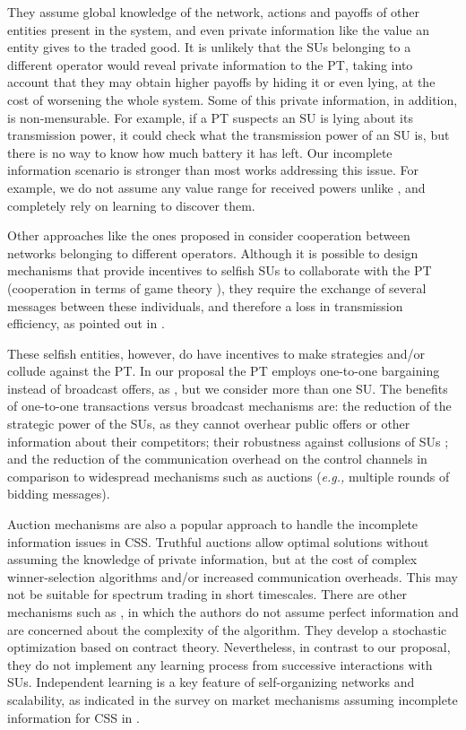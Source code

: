 They assume global knowledge of the network, actions and payoffs of other entities present in the system, and even private information like the value an entity gives to the traded good.
It is unlikely that the SUs belonging to a different operator would reveal private information to the PT, taking into account that they may obtain higher payoffs by hiding it or even lying, at the cost of worsening the whole system. 
Some of this private information, in addition, is non-mensurable. For example, if a PT suspects an SU is lying about its transmission power, it could check what the transmission power of an SU is, but there is no way to know how much battery it has left. 
Our incomplete information scenario is stronger than most works addressing this issue. 
For example, we do not assume any value range for received powers unlike \cite{ref:Feng2014}, and completely rely on learning to discover them. 

Other approaches like the ones proposed in \cite{ref:Yuan2013,ref:Han2010,ref:Li2011} consider cooperation between networks belonging to different operators. 
Although it is possible to design mechanisms that provide incentives to selfish SUs to collaborate with the PT (cooperation in terms of game theory \cite{ref:Zhang2012_Fair}), they require the exchange of several messages between these individuals, and therefore a loss in transmission efficiency, as pointed out in \cite{ref:Niyato2008}.

These selfish entities, however, do have incentives to make strategies and/or collude against the PT. 
In our proposal the PT employs one-to-one bargaining instead of broadcast offers, as \cite{ref:Yan2013}, but we consider more than one SU. The benefits of one-to-one transactions versus broadcast mechanisms \cite{ref:Feng2014,ref:Duan2014,ref:Jayaweera2011,ref:Zhang2009,ref:Simeone2008} are: the reduction of the strategic power of the SUs, as they cannot overhear public offers or other information about their competitors; their robustness against collusions of SUs \cite{ref:Alcaraz2014}; and the reduction of the communication overhead on the control channels in comparison to widespread mechanisms such as auctions \cite{ref:Feng2014, ref:Jayaweera2011} (\textit{e.g.,} multiple rounds of bidding messages).
 
Auction mechanisms are also a popular approach to handle the incomplete information issues in CSS.
Truthful auctions allow optimal solutions without assuming the knowledge of private information, but at the cost of complex winner-selection algorithms and/or increased communication overheads. 
This may not be suitable for spectrum trading in short timescales. There are other mechanisms such as \cite{ref:Duan2014}, in which the authors do not assume perfect information and are concerned about the complexity of the algorithm. They develop a stochastic optimization based on contract theory. Nevertheless, in contrast to our proposal, they do not implement any learning process from successive interactions with SUs. Independent learning is a key feature of self-organizing networks and scalability, as indicated in the survey on market mechanisms assuming incomplete information for CSS in \cite{ref:Huang2013}.

